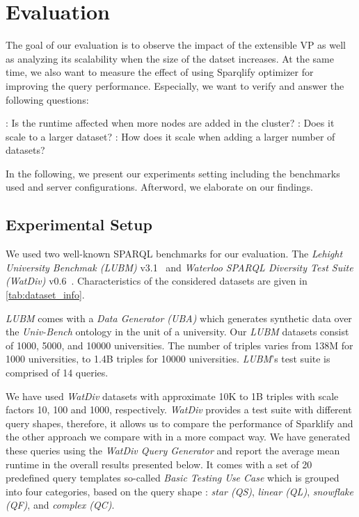 \section{Evaluation}
\label{sec:evaluation}

The goal of our evaluation is to observe the impact of the extensible VP as well as analyzing its scalability when the size of the datset increases.
At the same time, we also want to measure the effect of using Sparqlify optimizer for improving the query performance.
Especially, we want to verify and answer the following questions:
\begin{itemize}
\addtolength{\itemindent}{1cm}
    \newitem[Q1]\label{item:Q1}: Is the runtime affected when more nodes are added in the cluster?
    \newitem[Q2]\label{item:Q2}: Does it scale to a larger dataset?
    \newitem[Q3]\label{item:Q3}: How does it scale when adding a larger number of datasets?
\end{itemize}
In the following, we present our experiments setting including the benchmarks used and server configurations.
Afterword, we elaborate on our findings.

\subsection{Experimental Setup}
We used two well-known SPARQL benchmarks for our evaluation.
The \textit{Lehight University Benchmak (LUBM)} v3.1~\cite{Guo2005LUBMAB} and \textit{Waterloo SPARQL Diversity Test Suite (WatDiv)} v0.6~\cite{Alu2014DiversifiedST}.
Characteristics of the considered datasets are given in \autoref{tab:dataset_info}.

\textit{LUBM} comes with a \textit{Data Generator (UBA)} which generates synthetic data over the \textit{Univ-Bench} ontology in the unit of a university.
Our \textit{LUBM} datasets consist of 1000, 5000, and 10000 universities.
The number of triples varies from 138M for 1000 universities, to 1.4B triples for 10000 universities.
\textit{LUBM}'s test suite is comprised of 14 queries. %

We have used \textit{WatDiv} datasets with approximate 10K to 1B triples with scale factors 10, 100 and 1000, respectively.
\textit{WatDiv} provides a test suite with different query shapes, therefore, it allows us to compare the performance of Sparklify and the other approach we compare with in a more compact way.
We have generated these queries using the \textit{WatDiv Query Generator} and report the average mean runtime in the overall results presented below.
It comes with a set of 20 predefined query templates so-called \textit{Basic Testing Use Case} which is grouped into four categories, based on the query shape : \textit{star (QS)}, \textit{linear (QL)}, \textit{snowflake (QF)}, and \textit{complex (QC)}.


